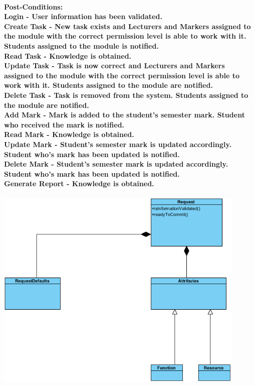 \documentclass[12pt]{article}
\begin{document}
 \paragraph*{Post-Conditions: \\ Login - User information has been validated.
 \\ Create Task - New task exists and Lecturers and Markers assigned to the module with the correct permission level is able to work with it. Students assigned to the module is notified.
 \\ Read Task - Knowledge is obtained.
 \\ Update Task - Task is now correct and Lecturers and Markers assigned to the module with the correct permission level is able to work with it. Students assigned to the module are notified.
 \\ Delete Task - Task is removed from the system. Students assigned to the module are notified.
 \\ Add Mark - Mark is added to the student's semester mark. Student who received the mark is notified.
 \\ Read Mark - Knowledge is obtained.
 \\ Update Mark - Student's semester mark is updated accordingly. Student who's mark has been updated is notified.
 \\ Delete Mark - Student's semester mark is updated accordingly. Student who's mark has been updated is notified.
 \\ Generate Report - Knowledge is obtained.}
 \begin{center}
  \includegraphics[width=120mm]{Diagram1.png}  
  \end{center}
\end{document}
